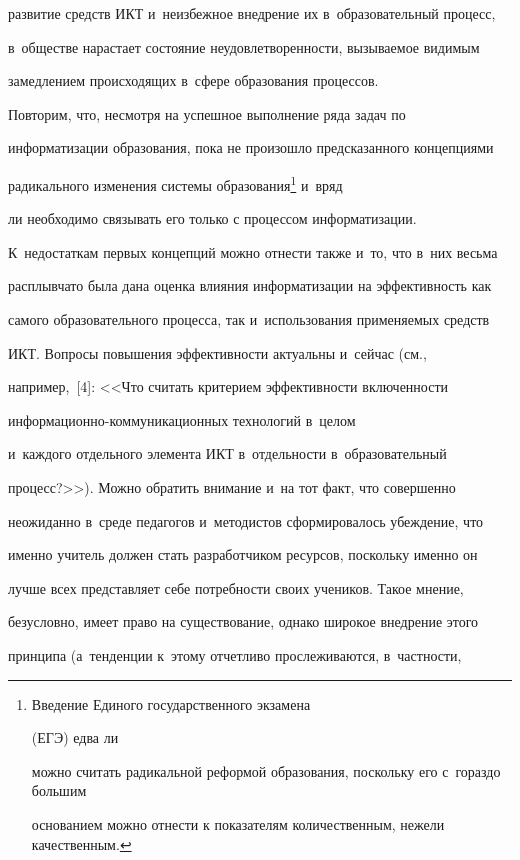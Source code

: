 развитие средств ИКТ и~неизбежное внедрение их в~образовательный процесс,


в~обществе нарастает состояние неудовлетворенности, вызываемое видимым


замедлением происходящих в~сфере образования процессов.





     Повторим, что, несмотря на успешное выполнение ряда задач по


информатизации образования, пока не произошло предсказанного концепциями


радикального изменения системы образования\footnote{Введение Единого государственного экзамена


(ЕГЭ) едва ли


можно считать радикальной реформой образования, поскольку его с~гораздо большим


основанием можно отнести к показателям количественным, нежели качественным.} и~вряд


ли необходимо связывать его только с процессом информатизации.


К~недостаткам первых концепций можно отнести также и~то, что в~них весьма


расплывчато была дана оценка влияния информатизации на эффективность как


самого образовательного процесса, так и~использования применяемых средств


ИКТ. Вопросы повышения эффективности актуальны и~сейчас (см.,


например,~[4]: <<Что считать критерием эффективности включенности


     ин\-фор\-ма\-ци\-он\-но-ком\-му\-ни\-ка\-ци\-он\-ных технологий в~целом


и~каж\-до\-го отдельного элемента ИКТ в~отдельности в~образовательный


процесс?>>). Можно обратить внимание и~на тот факт, что совершенно


неожиданно в~среде педагогов и~методистов сформировалось убеждение, что


именно учитель должен стать разработчиком ресурсов, поскольку именно он


лучше всех представляет себе потребности своих учеников. Такое мнение,


безусловно, имеет право на существование, однако широкое внедрение этого


принципа (а~тенденции к~этому отчетливо прослеживаются, в~частности,


